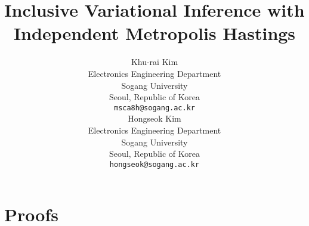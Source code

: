 \documentclass{article}
\title{Inclusive Variational Inference with \\ Independent Metropolis Hastings}
\author{%
  Khu-rai Kim \\
  Electronics Engineering Department \\
  Sogang University\\
  Seoul, Republic of Korea \\
  \texttt{msca8h@sogang.ac.kr} \\
  \And
  Hongseok Kim \\
  Electronics Engineering Department \\
  Sogang University\\
  Seoul, Republic of Korea \\
  \texttt{hongseok@sogang.ac.kr} \\
}
\begin{document}
\maketitle

\begin{abstract}
  
\end{abstract}







\newpage





\newpage
\appendix
\section{Proofs}
\printProofs
\end{document}
